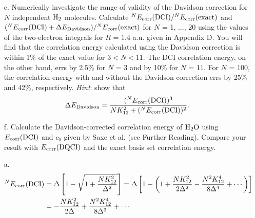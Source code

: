\documentclass[a4paper]{book}
\newcommand{\corr}{{\rm corr}}
\begin{document}
\begin{exercise}
\begin{enumerate}
	\item[e.] Numerically investigate the range of validity of the Davidson correction for $N$ independent $\ce{H2}$ molecules. Calculate ${}^N E_\corr( {\rm DCI} )/ {}^N E_\corr( {\rm exact} )$ and $({}^N E_\corr( {\rm DCI} ) + \Delta E_{\rm Davidson} )/ {}^N E_\corr( {\rm exact} )$ for $N$ = 1, $\ldots$, 20 using the values of the two-electron integrals for $R$ = 1.4 a.u. given in Appendix D. You will find that the correlation energy calculated using the Davidson correction is within 1\% of the exact value for $3<N<11$. The DCI correlation energy, on the other hand, errs by 2.5\% for $N$ = 3 and by 10\% for $N$ = 11. For $N$ = 100, the correlation energy with and without the Davidson correction errs by 25\% and 42\%, respectively. {\it Hint}: show that
	\[
		\Delta E_{\rm Davidson} = \frac{ ({}^N E_\corr( {\rm DCI} ))^3 }{ NK^2_{12} + ( {}^N E_\corr( {\rm DCI} ) )^2 }.
	\]
	
	\item[f.] Calculate the Davidson-corrected correlation energy of $\ce{H2O}$ using $E_\corr( {\rm DCI} )$ and $c_0$ given by Saxe et al. (see Further Reading). Compare your result with $E_\corr( {\rm DQCI} )$ and the exact basis set correlation energy.
	\end{enumerate}
	\end{exercise}
	
	\begin{solution}
	
	\begin{itemize}
	
	\item[a.]
	\begin{align}
		^N E_\corr ({\rm DCI}) &= \Delta \left[ 1 - \sqrt{ 1 + \frac{ N K^2_{12} }{ \Delta^2 } } \right] = \Delta \left[ 1 - \left( 1 + \frac{ N K^2_{12} }{ 2\Delta^2 } - \frac{ N^2 K^4_{12} }{ 8\Delta^4 } + \cdots \right) \right] \notag \\
		&= - \frac{ N K^2_{12} }{ 2\Delta } + \frac{ N^2 K^4_{12} }{ 8\Delta^3 } + \cdots
	\end{align}
	
	\end{itemize}		
	
	
	\end{solution}
	
\end{document}
